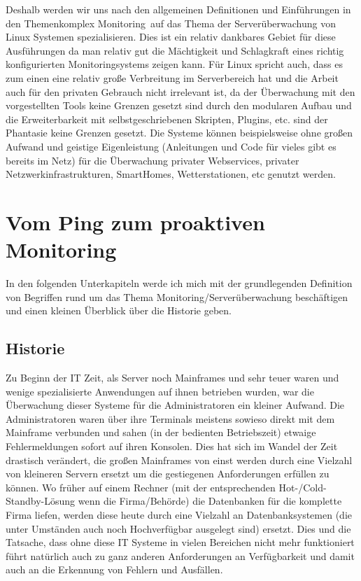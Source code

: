 \documentclass[12pt,a4paper,parskip,listof=totoc,bibliography=totoc]{scrreprt}
\begin{document}
	Deshalb werden wir uns nach den allgemeinen Definitionen und Einführungen in den Themenkomplex \glqq Monitoring\grqq\ auf das Thema der Serverüberwachung von Linux Systemen spezialisieren. Dies ist ein relativ dankbares Gebiet für diese Ausführungen da man relativ gut die Mächtigkeit und Schlagkraft eines richtig konfigurierten Monitoringsystems zeigen kann. Für Linux spricht auch, dass es zum einen eine relativ große Verbreitung im Serverbereich hat und die Arbeit auch für den privaten Gebrauch nicht irrelevant ist, da der Überwachung mit den vorgestellten Tools keine Grenzen gesetzt sind durch den modularen Aufbau und die Erweiterbarkeit mit selbstgeschriebenen Skripten, Plugins, \acrshort{etc}. sind der Phantasie keine Grenzen gesetzt. Die Systeme können beispielsweise ohne großen Aufwand und geistige Eigenleistung (Anleitungen und Code für vieles gibt es bereits im Netz) für die Überwachung privater Webservices, privater Netzwerkinfrastrukturen, SmartHomes, Wetterstationen, \acrshort{etc} genutzt werden.
		
	
	\chapter{Vom Ping zum proaktiven Monitoring}
	In den folgenden Unterkapiteln werde ich mich mit der grundlegenden Definition von Begriffen rund um das Thema Monitoring/Serverüberwachung beschäftigen und einen kleinen Überblick über die Historie geben.
	\section{Historie}
	Zu Beginn der IT Zeit, als Server noch Mainframes und sehr teuer waren und wenige spezialisierte Anwendungen auf ihnen betrieben wurden, war die Überwachung dieser Systeme für die Administratoren ein kleiner Aufwand. Die Administratoren waren über ihre Terminals meistens sowieso direkt mit dem Mainframe verbunden und sahen (in der bedienten Betriebszeit) etwaige Fehlermeldungen sofort auf ihren Konsolen. Dies hat sich im Wandel der Zeit drastisch verändert, die großen Mainframes von einst werden durch eine Vielzahl von kleineren Servern ersetzt um die gestiegenen Anforderungen erfüllen zu können. Wo früher auf einem Rechner (mit der entsprechenden Hot-/Cold-Standby-Lösung wenn die Firma/Behörde) die Datenbanken für die komplette Firma liefen, werden diese heute durch eine Vielzahl an Datenbanksystemen (die unter Umständen auch noch Hochverfügbar ausgelegt sind) ersetzt. Dies und die Tatsache, dass ohne diese IT Systeme in vielen Bereichen nicht mehr funktioniert führt natürlich auch zu ganz anderen Anforderungen an Verfügbarkeit und damit auch an die Erkennung von Fehlern und Ausfällen. 
	
\end{document}
